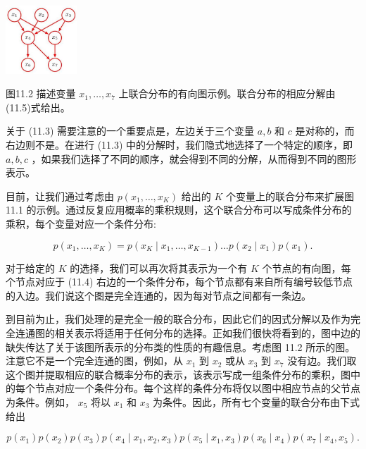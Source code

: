 \documentclass[10pt]{article}
\begin{document}
\begin{center}
\includegraphics[max width=0.2\textwidth]{images/0194e279-9b28-703a-88f4-c3ac21e2010d_347_1211_345_342_328_0.jpg}
\end{center}
\hspace*{3em} 

图11.2 描述变量 \({x}_{1},\ldots ,{x}_{7}\) 上联合分布的有向图示例。联合分布的相应分解由(11.5)式给出。

关于 (11.3) 需要注意的一个重要点是，左边关于三个变量 \(a,b\) 和 \(c\) 是对称的，而右边则不是。在进行 (11.3) 中的分解时，我们隐式地选择了一个特定的顺序，即 \(a,b,c\) ，如果我们选择了不同的顺序，就会得到不同的分解，从而得到不同的图形表示。

目前，让我们通过考虑由 \(p\left( {{x}_{1},\ldots ,{x}_{K}}\right)\) 给出的 \(K\) 个变量上的联合分布来扩展图 11.1 的示例。通过反复应用概率的乘积规则，这个联合分布可以写成条件分布的乘积，每个变量对应一个条件分布:

\[
p\left( {{x}_{1},\ldots ,{x}_{K}}\right)  = p\left( {{x}_{K} \mid  {x}_{1},\ldots ,{x}_{K - 1}}\right) \ldots p\left( {{x}_{2} \mid  {x}_{1}}\right) p\left( {x}_{1}\right) . \tag{11.4}
\]

对于给定的 \(K\) 的选择，我们可以再次将其表示为一个有 \(K\) 个节点的有向图，每个节点对应于 (11.4) 右边的一个条件分布，每个节点都有来自所有编号较低节点的入边。我们说这个图是完全连通的，因为每对节点之间都有一条边。

到目前为止，我们处理的是完全一般的联合分布，因此它们的因式分解以及作为完全连通图的相关表示将适用于任何分布的选择。正如我们很快将看到的，图中边的缺失传达了关于该图所表示的分布类的性质的有趣信息。考虑图 11.2 所示的图。注意它不是一个完全连通的图，例如，从 \({x}_{1}\) 到 \({x}_{2}\) 或从 \({x}_{3}\) 到 \({x}_{7}\) 没有边。我们取这个图并提取相应的联合概率分布的表示，该表示写成一组条件分布的乘积，图中的每个节点对应一个条件分布。每个这样的条件分布将仅以图中相应节点的父节点为条件。例如， \({x}_{5}\) 将以 \({x}_{1}\) 和 \({x}_{3}\) 为条件。因此，所有七个变量的联合分布由下式给出

\[
p\left( {x}_{1}\right) p\left( {x}_{2}\right) p\left( {x}_{3}\right) p\left( {{x}_{4} \mid  {x}_{1},{x}_{2},{x}_{3}}\right) p\left( {{x}_{5} \mid  {x}_{1},{x}_{3}}\right) p\left( {{x}_{6} \mid  {x}_{4}}\right) p\left( {{x}_{7} \mid  {x}_{4},{x}_{5}}\right) . \tag{11.5}
\]
\end{document}
